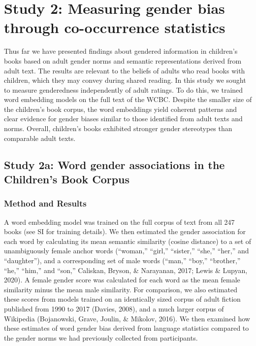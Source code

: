 \documentclass[
  english,
  ,man,floatsintext]{apa6}
\begin{document}
\hypertarget{study-2-measuring-gender-bias-through-co-occurrence-statistics}{%
\section{Study 2: Measuring gender bias through co-occurrence statistics}\label{study-2-measuring-gender-bias-through-co-occurrence-statistics}}

Thus far we have presented findings about gendered information in children's books based on adult gender norms and semantic representations derived from adult text. The results are relevant to the beliefs of adults who read books with children, which they may convey during shared reading. In this study we sought to measure genderedness independently of adult ratings. To do this, we trained word embedding models on the full text of the WCBC. Despite the smaller size of the children's book corpus, the word embeddings yield coherent patterns and clear evidence for gender biases similar to those identified from adult texts and norms. Overall, children's books exhibited stronger gender stereotypes than comparable adult texts.

\hypertarget{study-2a-word-gender-associations-in-the-childrens-book-corpus}{%
\subsection{Study 2a: Word gender associations in the Children's Book Corpus}\label{study-2a-word-gender-associations-in-the-childrens-book-corpus}}

\hypertarget{method-and-results-1}{%
\subsubsection{Method and Results}\label{method-and-results-1}}

A word embedding model was trained on the full corpus of text from all 247 books (see SI for training details). We then estimated the gender association for each word by calculating its mean semantic similarity (cosine distance) to a set of unambiguously female anchor words (``woman,'' ``girl,'' ``sister,'' ``she,'' ``her,'' and ``daughter''), and a corresponding set of male words ({``man,''} {``boy,''} {``brother,''} {``he,''} {``him,''} and {``son,''} Caliskan, Bryson, \& Narayanan, 2017; Lewis \& Lupyan, 2020). A female gender score was calculated for each word as the mean female similarity minus the mean male similarity. For comparison, we also estimated these scores from models trained on an identically sized corpus of adult fiction published from 1990 to 2017 (Davies, 2008), and a much larger corpus of Wikipedia (Bojanowski, Grave, Joulin, \& Mikolov, 2016). We then examined how these estimates of word gender bias derived from language statistics compared to the gender norms we had previously collected from participants.
\end{document}
